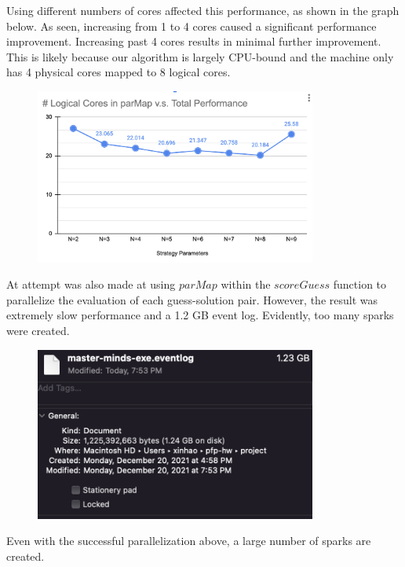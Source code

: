 \documentclass{article}
\begin{document}
Using different numbers of cores affected this performance, as shown in the graph below. As seen, increasing from 1 to 4 cores caused a significant performance improvement. Increasing past 4 cores results in minimal further improvement. This is likely because our algorithm is largely CPU-bound and the machine only has 4 physical cores mapped to 8 logical cores.
\begin{figure}[H]
	\centering
	\includegraphics[width=25em]{../images/pm_line.png}
\end{figure}


At attempt was also made at using $parMap$ within the $scoreGuess$ function to parallelize the evaluation of each guess-solution pair. However, the result was extremely slow performance and a 1.2 GB event log. Evidently, too many sparks were created.
\begin{figure}[H]
	\centering
	\includegraphics[width=25em]{../images/second_pm.png}
\end{figure}



Even with the successful parallelization above, a large number of sparks are created.
\end{document}
